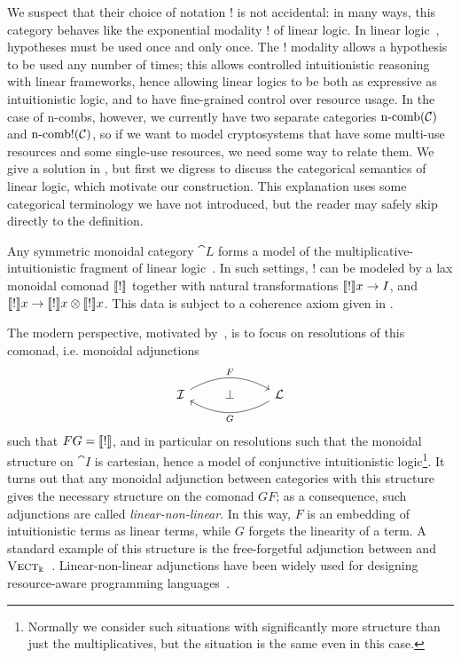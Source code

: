 We suspect that their choice of notation $!$
is not accidental: in many ways, this category behaves like the exponential
modality $!$ of linear logic. In linear logic~\cite{girard-1987}, hypotheses
must be used once and only once. The $!$ modality allows a hypothesis to be used
any number of times; this allows controlled intuitionistic reasoning with linear
frameworks, hence allowing linear logics to be both as expressive as intuitionistic
logic, and to have fine-grained control over resource usage. In the case of
n-combs, however, we currently have two separate categories $\operatorname*{n-comb}({\mathcal{C}})$
and $\operatorname*{n-comb!}({\mathcal{C}})$, so if we want to model cryptosystems that have some
multi-use resources and some single-use resources, we need some way to relate
them. We give a solution in , but first we
digress to discuss the categorical semantics of linear logic, which motivate our
construction. This explanation uses some categorical terminology we have not
introduced, but the reader may safely skip directly to the definition.

Any symmetric monoidal category $\cat{L}$ forms a model of the
multiplicative-intuitionistic fragment of linear logic~\cite{mellies-2009}. In such
settings, $!$ can be modeled by a lax monoidal comonad $\llbracket ! \rrbracket$ together
with natural transformations $\llbracket ! \rrbracket x\to I$, and
$\llbracket ! \rrbracket x\to\llbracket ! \rrbracket x\otimes\llbracket ! \rrbracket x$. This data is subject to a
coherence axiom given in \cite[Equation 72]{mellies-2009}.

The modern perspective, motivated by~\cite{benton-1995}, is to focus on
resolutions of this comonad, i.e. monoidal adjunctions \[
  \begin{tikzcd}
    \cat{I}\ar[rr, bend left, "F"] & \bot & \cat{L}\ar[ll, bend left, "G"]
  \end{tikzcd}
\]such that $FG = \llbracket ! \rrbracket$, and in particular on resolutions such that the
monoidal structure on $\cat{I}$ is cartesian, hence a model of conjunctive
intuitionistic logic\footnote{
  Normally we consider such situations with significantly more structure than just
  the multiplicatives, but the situation is the same even in this case.
}. It turns out that any monoidal adjunction between categories with this
structure gives the necessary structure on the comonad $GF$; as a consequence,
such adjunctions are called \emph{linear-non-linear}. In this way, $F$ is an
embedding of intuitionistic terms as linear terms, while $G$ forgets the
linearity of a term. A standard example of this structure is the free-forgetful
adjunction between  and
${\textsc{\text{Vect}}}_\Bbbk$~\cite{valiron-zdancewic-2014}. Linear-non-linear adjunctions
have been widely used for designing resource-aware programming
languages~\cite{maf-2005,krishnaswami-2015,paykin-2018,lmz-2019}.

